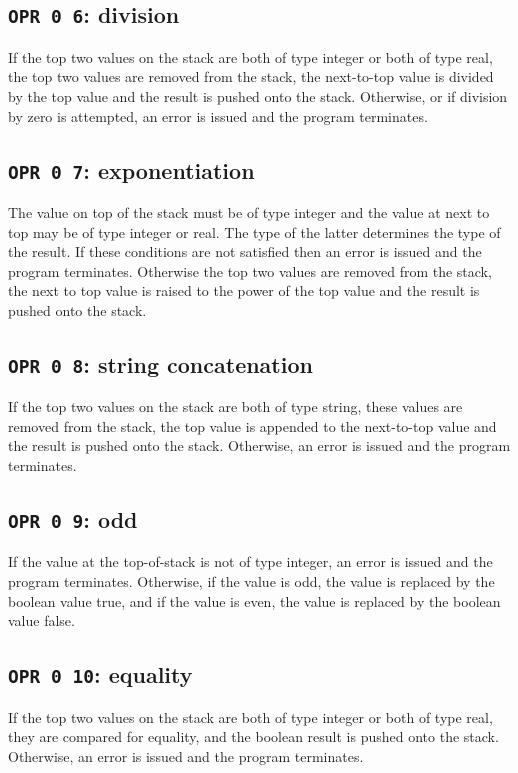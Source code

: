 \documentclass[a4paper,10pt]{report}
\begin{document}
\subsection{\texttt{OPR 0 6}: division}
If the top two values on the stack are both of type integer or both of
type real, the top two values are removed from the stack, the
next-to-top value is divided by the top value and the result is pushed
onto the stack.  Otherwise, or if division by zero is attempted, an
error is issued and the program terminates.

\subsection{\texttt{OPR 0 7}: exponentiation}
The value on top of the stack must be of type integer and the value at
next to top may be of type integer or real.  The type of the latter
determines the type of the result.  If these conditions are not
satisfied then an error is issued and the program terminates.
Otherwise the top two values are removed from the stack, the next to
top value is raised to the power of the top value and the result is
pushed onto the stack.

\subsection{\texttt{OPR 0 8}: string concatenation}
If the top two values on the stack are both of type string, these
values are removed from the stack, the top value is appended to the
next-to-top value and the result is pushed onto the stack.  Otherwise,
an error is issued and the program terminates.

\subsection{\texttt{OPR 0 9}: odd}
If the value at the top-of-stack is not of type integer, an error is
issued and the program terminates.  Otherwise, if the value is odd,
the value is replaced by the boolean value true, and if the value is
even, the value is replaced by the boolean value false.

\subsection{\texttt{OPR 0 10}: equality}
If the top two values on the stack are both of type integer or both of
type real, they are compared for equality, and the boolean result is
pushed onto the stack.  Otherwise, an error is issued and the program
terminates.
\end{document}
